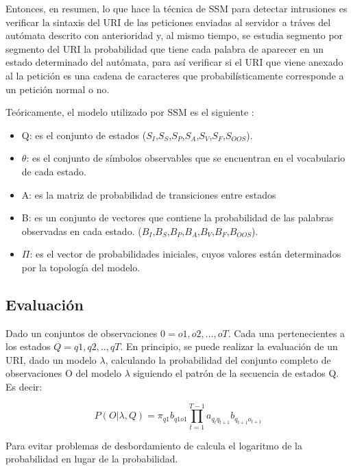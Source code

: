 Entonces, en resumen, lo que hace la t\'ecnica de SSM para detectar intrusiones es verificar la sintaxis del URI de las peticiones enviadas al servidor a tráves del autómata descrito con anterioridad y, al mismo tiempo, se estudia segmento por segmento del URI la probabilidad que tiene cada palabra de aparecer en un estado determinado del autómata, para as\'i verificar si el URI que viene anexado al la petici\'on es una cadena de caracteres que probabilísticamente corresponde a un petici\'on normal o no.

Teóricamente, el modelo utilizado por SSM es el siguiente \cite{tesisMexico}:

\begin{itemize}
\item Q: es el conjunto de estados ($S_{I}$,$S_{S}$,$S_{P}$,$S_{A}$,$S_{V}$,$S_{F}$,$S_{OOS}$).
\item $\theta$: es el conjunto de s\'imbolos observables que se encuentran en el vocabulario de cada estado.
\item A: es la matriz de probabilidad de transiciones entre estados
\item B: es un conjunto de vectores que contiene la probabilidad de las palabras observadas en cada estado. ($B_{I}$,$B_{S}$,$B_{P}$,$B_{A}$,$B_{V}$,$B_{F}$,$B_{OOS}$).
\item $\Pi$: es el vector de probabilidades iniciales, cuyos valores est\'an determinados por la topolog\'ia del modelo. 
\end{itemize}

\subsection*{Evaluación}
\label{subsec:exprIndice}

Dado un conjuntos de observaciones $0 = o1,o2,...,oT$. Cada una pertenecientes a los estados $Q = q1,q2,..,qT$. En principio, se puede realizar la evaluación de un URI, dado un modelo $\lambda$,  calculando la probabilidad del conjunto completo de observaciones O del modelo $\lambda$ siguiendo el patrón de la secuencia de estados Q. Es decir:

\begin{equation}
P(O|\lambda,Q) = \pi_{q1}b_{q1o1}\prod_{t=1}^{T-1}a_{q_{t}q_{t+1}}b_{q_{t+1}o_{t+1}}
\end{equation}

Para evitar problemas de desbordamiento de calcula el logaritmo de la probabilidad en lugar de la probabilidad.

